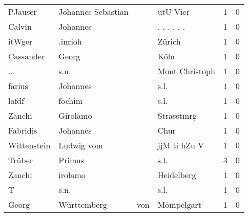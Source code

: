 \begin{tabular}{llllrr}
                  PJauser &                 Johannes Sebastian &             &                                    utU Vicr &          1 &         0 \\
                   Calvin &                           Johannes &             &                                . . . . . .  &          1 &         0 \\
                   itWger &                            .inrioh &             &                                      Zürich &          1 &         0 \\
                Cassander &                              Georg &             &                                        Köln &          1 &         0 \\
                      ... &                               s.n. &             &                              Mont Christoph &          1 &         0 \\
                   farius &                           Johannes &             &                                        s.l. &          1 &         0 \\
                    lafdf &                             fochim &             &                                        s.l. &          1 &         0 \\
                   Zanchi &                           Girolamo &             &                                  Strasstmrg &          1 &         0 \\
                 Fabridis &                           Johannes &             &                                        Chur &          1 &         0 \\
              Wittenstein &                         Ludwig vom &             &                                jjM ti hZu V &          1 &         0 \\
                   Trüber &                             Primus &             &                                        s.l. &          3 &         0 \\
                   Zanchi &                            irolamo &             &                                  Heidelberg &          1 &         0 \\
                        T &                               s.n. &             &                                        s.l. &          1 &         0 \\
                    Georg &                        Württemberg &         von &                                  Mömpelgart &          1 &         0 \\

\end{tabular}
